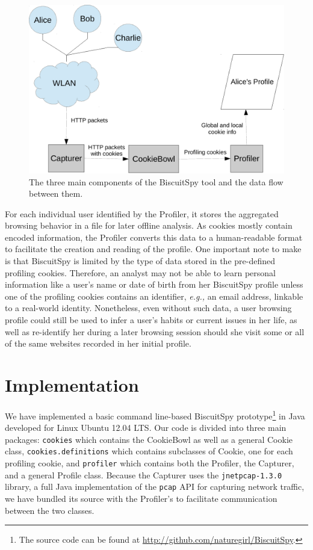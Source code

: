 \begin{figure}[h]
\centering
\includegraphics[scale=0.5]{./diagrams/dataflow.pdf}
\caption{The three main components of the BiscuitSpy tool and the data flow between them.}
\label{fig:dataflow}
\end{figure}

For each individual user identified by the Profiler, it stores the aggregated browsing behavior in a file for later offline analysis.
As cookies mostly contain encoded information, the Profiler converts this data to a human-readable format to facilitate the creation and reading of the profile.
One important note to make is that BiscuitSpy is limited by the type of data stored in the pre-defined profiling cookies.
Therefore, an analyst may not be able to learn personal information like a user's name or date of birth from her BiscuitSpy profile unless one of the profiling cookies contains an identifier, \emph{e.g.,} an email address, linkable to a real-world identity.
Nonetheless, even without such data, a user browsing profile could still be used to infer a user's habits or current issues in her life, as well as re-identify her during a later browsing session should she visit some or all of the same websites recorded in her initial profile.


\section{Implementation}
\label{sec:implementation}

We have implemented a basic command line-based BiscuitSpy prototype\footnote{The source code can be found at \url{http://github.com/naturegirl/BiscuitSpy}.} in Java developed for Linux Ubuntu 12.04 LTS.
Our code is divided into three main packages: \texttt{cookies} which contains the CookieBowl as well as a general Cookie class, \texttt{cookies.definitions} which contains subclasses of Cookie, one for each profiling cookie, and \texttt{profiler} which contains both the Profiler, the Capturer, and a general Profile class.
Because the Capturer uses the \texttt{jnetpcap-1.3.0} library, a full Java implementation of the \texttt{pcap} API for capturing network traffic, we have bundled its source with the Profiler's to facilitate communication between the two classes.

